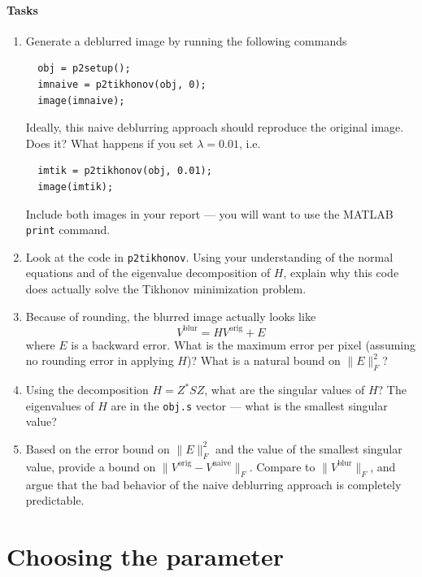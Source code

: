 \documentclass[12pt, leqno]{article} %
\begin{document}
\paragraph*{Tasks}
\begin{enumerate}
\item
  Generate a deblurred image by running the following commands
\begin{lstlisting}
  obj = p2setup();
  imnaive = p2tikhonov(obj, 0);
  image(imnaive);
\end{lstlisting}
  Ideally, this naive deblurring approach should reproduce the
  original image.  Does it?  What happens if you set $\lambda = 0.01$,
  i.e.
\begin{lstlisting}
  imtik = p2tikhonov(obj, 0.01);
  image(imtik);
\end{lstlisting}
  Include both images in your report --- you will want to use the
  MATLAB {\tt print} command.

\item
  Look at the code in {\tt p2tikhonov}.  Using your understanding
  of the normal equations and of the eigenvalue decomposition of $H$,
  explain why this code does actually solve the Tikhonov minimization
  problem.

\item
  Because of rounding, the blurred image actually looks like
  \[
    V^{\mathrm{blur}} = HV^{\mathrm{orig}} + E
  \]
  where $E$ is a backward error.  What is the maximum error per pixel
  (assuming no rounding error in applying $H$)?  What is a natural
  bound on $\|E\|_F^2$?

\item
  Using the decomposition $H = Z^* S Z$, what are the singular values
  of $H$?
  The eigenvalues of $H$ are in the {\tt obj.s} vector --- what is the
  smallest singular value?

\item
  Based on the
  error bound on $\|E\|_F^2$ and the value of the smallest singular
  value, provide a bound on $\|V^{\mathrm{orig}}-V^{\mathrm{naive}}\|_F$.
  Compare to $\|V^{\mathrm{blur}}\|_F$, and
  argue that the bad behavior of the naive deblurring approach is
  completely predictable.

\end{enumerate}

\section{Choosing the parameter}
\end{document}
